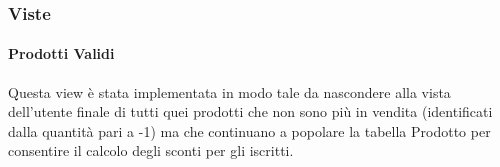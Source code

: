 

\subsubsection{Viste}

\paragraph*{Prodotti Validi}

Questa view \`e stata implementata in modo tale da nascondere alla vista dell'utente finale di tutti quei prodotti che non sono pi\`u in vendita (identificati dalla quantit\`a pari a -1) ma che continuano a popolare la tabella Prodotto per consentire il calcolo degli sconti per gli iscritti.


